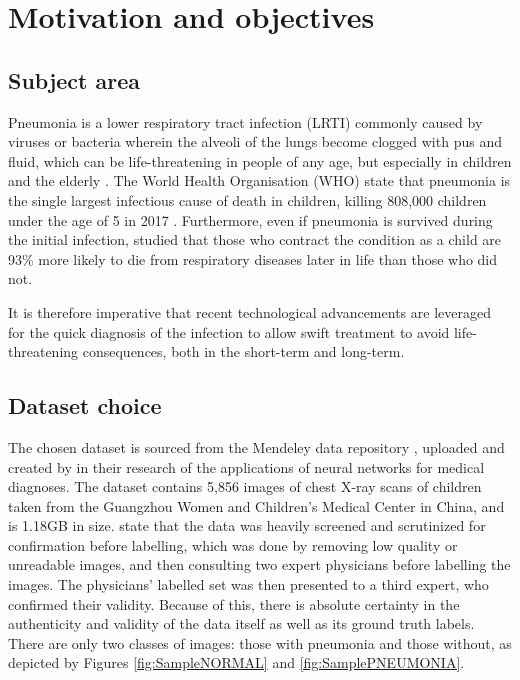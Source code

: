 \documentclass[12pt]{report}
\newcommand{\para}{\vspace{7pt}\noindent}
\begin{document}


\chapter{Motivation and objectives}

\section{Subject area}

Pneumonia is a lower respiratory tract infection (LRTI) commonly caused by viruses or bacteria wherein the alveoli of the lungs 
become clogged with pus and fluid, which can be life-threatening in people of any age, but especially in children and the elderly
\autocite{nhsPneumonia2017}. The World Health Organisation (WHO) state that pneumonia is the single largest infectious cause of death 
in children, killing 808,000 children under the age of 5 in 2017 \autocite{whoPneumonia}. Furthermore, even if pneumonia is survived during the 
initial infection, \textcite{allinsonEarlyChildhoodLower2023} studied that those who contract the condition as a child are 93\% more likely to die 
from respiratory diseases later in life than those who did not.

\para It is therefore imperative that recent technological advancements are leveraged for the quick diagnosis of the infection to allow swift 
treatment to avoid life-threatening consequences, both in the short-term and long-term. 

\section{Dataset choice}
The chosen dataset is sourced from the Mendeley data repository \autocite{mendeleydataLargeDatasetLabeled}, uploaded and created by  
\textcite[p.1127]{kermanyIdentifyingMedicalDiagnoses2018} in their research of the applications of neural networks for medical diagnoses.
The dataset contains 5,856 images of chest X-ray scans of children taken from the
Guangzhou Women and Children's Medical Center in China, and is 1.18GB in size. \textcite[p.e1]{kermanyIdentifyingMedicalDiagnoses2018} 
state that the data was heavily screened and scrutinized for confirmation before labelling, which was done by removing low quality or unreadable images,
and then consulting two expert physicians before labelling the images. The physicians' labelled set was then presented to a third expert, 
who confirmed their validity. Because of this, there is absolute certainty in the authenticity and validity of the data itself as well as its 
ground truth labels.
There are only two classes of images: those with 
pneumonia and those without, as depicted by Figures \ref{fig:SampleNORMAL} and \ref{fig:SamplePNEUMONIA}.
\end{document}

